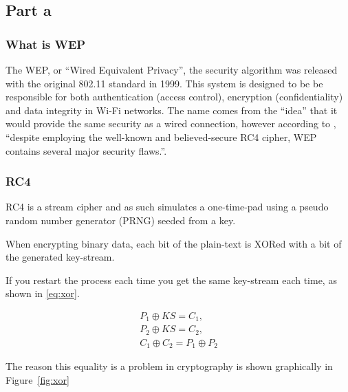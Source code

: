 \documentclass[pdftex, 12pt, a4paper]{article}
\begin{document}
\subsection{Part a}
\subsubsection{What is WEP}
The WEP, or ``Wired Equivalent Privacy'', the security algorithm was released with the original 802.11 standard in 1999\cite{802.11}.  This system is designed to be be responsible for both authentication (access control), encryption (confidentiality) and data integrity in Wi-Fi networks. The name comes from the ``idea'' that it would provide the same security as a wired connection, however according to \textcite{intercepting-wifi}, ``despite employing the well-known and believed-secure RC4 cipher, WEP contains several major security flaws.''.

\subsubsection{RC4}
RC4 is a stream cipher and as such simulates a one-time-pad using a pseudo random number generator (PRNG) seeded from a key\cite{otp-faq}.

When encrypting binary data, each bit of the plain-text is XORed with a bit of the generated key-stream.

If you restart the process each time you get the same key-stream each time, as shown in \ref{eq:xor}.

\begin{subequations}
    \begin{align}
        P_1 \oplus KS = C_1,\\
        P_2 \oplus KS = C_2,\\
        C_1 \oplus C_2 = P_1 \oplus P_2\label{eq:xor}
    \end{align}
\end{subequations}

The reason this equality is a problem in cryptography is shown graphically in Figure~\ref{fig:xor}
\end{document}
